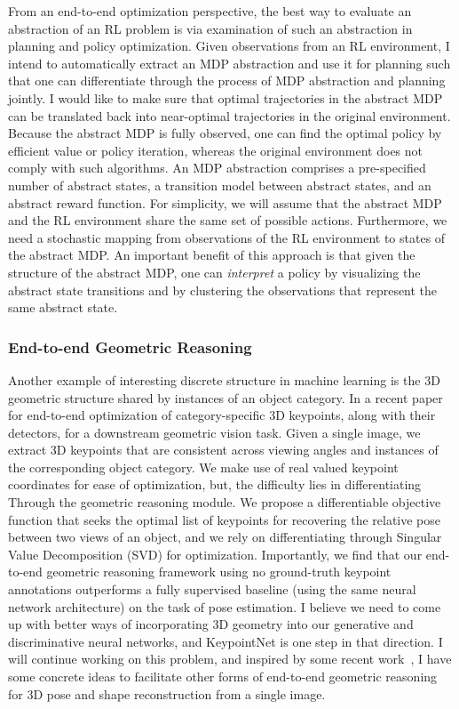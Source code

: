 \documentclass[a4paper, 10pt]{article}
\begin{document}
{From an end-to-end optimization perspective, the best way to evaluate
an abstraction of an RL problem is via examination of such an
abstraction in planning and policy optimization. Given observations
from an RL environment, I intend to automatically extract an MDP
abstraction and use it for planning such that one can differentiate
through the process of MDP abstraction and planning jointly. I would
like to make sure that optimal trajectories in the abstract MDP can be
translated back into near-optimal trajectories in the original
environment. Because the abstract MDP is fully observed, one can find
the optimal policy by efficient value or policy iteration, whereas the
original environment does not comply with such algorithms. An MDP
abstraction comprises a pre-specified number of abstract states, a
transition model between abstract states, and an abstract reward
function. For simplicity, we will assume that the abstract MDP and the
RL environment share the same set of possible actions. Furthermore, we
need a stochastic mapping from observations of the RL environment to
states of the abstract MDP. An important benefit of this approach is
that given the structure of the abstract MDP, one can {\em interpret} a
policy by visualizing the abstract state transitions and by clustering
the observations that represent the same abstract state.

\vspace*{-.2cm}
\subsubsection*{End-to-end Geometric Reasoning}
\vspace*{-.1cm}

\hspace{\parindent} Another example of interesting discrete structure
in machine learning is the 3D geometric structure shared by instances
of an object category. In a recent paper~\cite{keypointnet} for
end-to-end optimization of category-specific 3D keypoints, along with
their detectors, for a downstream geometric vision task. Given a
single image, we extract 3D keypoints that are consistent across
viewing angles and instances of the corresponding object category. We
make use of real valued keypoint coordinates for ease of optimization,
but, the difficulty lies in differentiating Through the geometric
reasoning module. We propose a differentiable objective function that
seeks the optimal list of keypoints for recovering the relative pose
between two views of an object, and we rely on differentiating through
Singular Value Decomposition (SVD) for optimization.  Importantly, we
find that our end-to-end geometric reasoning framework using no
ground-truth keypoint annotations outperforms a fully supervised
baseline (using the same neural network architecture) on the task of
pose estimation. I believe we need to come up with better ways of
incorporating 3D geometry into our generative and discriminative
neural networks, and KeypointNet is one step in that direction. I will
continue working on this problem, and inspired by some recent
work~\cite{kanazawa}, I have some concrete ideas to facilitate other
forms of end-to-end geometric reasoning for 3D pose and shape
reconstruction from a single image.

}
\end{document}
